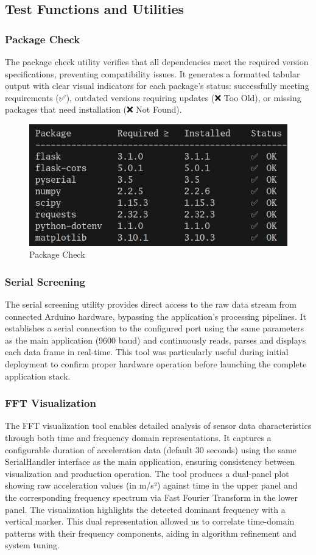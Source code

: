 \documentclass{article}
\begin{document}
\subsection{Test Functions and Utilities}
    \subsubsection{Package Check}
    The package check utility verifies that all dependencies meet the required version specifications, preventing compatibility issues. It generates a formatted tabular output with clear visual indicators for each package's status: successfully meeting requirements (✅), outdated versions requiring updates (❌ Too Old), or missing packages that need installation (❌ Not Found).
    
    \begin{figure} [h]
        \centering
        \includegraphics[width=0.5\linewidth]{assets/check-packages.png}
        \caption{Package Check}
        \label{fig:enter-label}
    \end{figure}
    
    \subsubsection{Serial Screening}
    The serial screening utility provides direct access to the raw data stream from connected Arduino hardware, bypassing the application's processing pipelines. It establishes a serial connection to the configured port using the same parameters as the main application (9600 baud) and continuously reads, parses and displays each data frame in real-time. This tool was particularly useful during initial deployment to confirm proper hardware operation before launching the complete application stack.

    \subsubsection{FFT Visualization}
    The FFT visualization tool enables detailed analysis of sensor data characteristics through both time and frequency domain representations. It captures a configurable duration of acceleration data (default 30 seconds) using the same SerialHandler interface as the main application, ensuring consistency between visualization and production operation. The tool produces a dual-panel plot showing raw acceleration values (in m/s²) against time in the upper panel and the corresponding frequency spectrum via Fast Fourier Transform in the lower panel. The visualization highlights the detected dominant frequency with a vertical marker. This dual representation allowed us to correlate time-domain patterns with their frequency components, aiding in algorithm refinement and system tuning.
\end{document}
